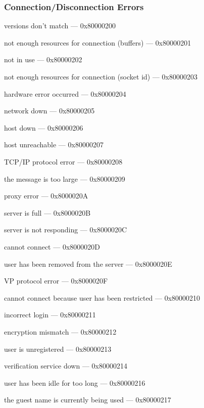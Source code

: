 \documentclass[titlepage,oneside]{book}
\begin{document}
\subsubsection{Connection/Disconnection Errors}

versions don't match                              --- 0x80000200

not enough resources for connection (buffers)     --- 0x80000201

not in use                                        --- 0x80000202

not enough resources for connection (socket id)   --- 0x80000203

hardware error occurred                           --- 0x80000204

network down                                      --- 0x80000205

host down                                         --- 0x80000206

host unreachable                                  --- 0x80000207

TCP/IP protocol error                             --- 0x80000208

the message is too large                          --- 0x80000209

proxy error                                       --- 0x8000020A

server is full                                    --- 0x8000020B

server is not responding                          --- 0x8000020C

cannot connect                                    --- 0x8000020D

user has been removed from the server             --- 0x8000020E

VP protocol error                                 --- 0x8000020F

cannot connect because user has been restricted   --- 0x80000210

incorrect login                                   --- 0x80000211

encryption mismatch                               --- 0x80000212

user is unregistered                              --- 0x80000213

verification service down                         --- 0x80000214

user has been idle for too long                   --- 0x80000216

the guest name is currently being used            --- 0x80000217
\end{document}
